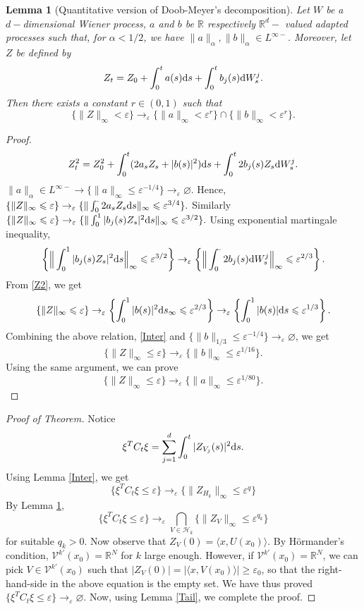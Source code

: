 \documentclass[twoside, 12pt]{book}
\numberwithin{equation}{chapter}
\newtheorem{lemma}[theorem]{Lemma}
\def\mR{{\mathbb R}}
\def\sH{{\mathscr H}}
\def\sV{{\mathscr V}}
\def\<{\langle}
\def\>{\rangle}
\def\geq{\geqslant}
\def\leq{\leqslant}
\def\d{\text{\rm{d}}}
\def\eps{\varepsilon}
\begin{document}
	
	\begin{lemma}[Quantitative version of Doob-Meyer's decomposition]\label{Z-to-ab}
	Let $W$ be a $d-$dimensional Wiener process, $a$ and $b$ be $\mR$ respectively $\mR^d-$ valued adapted processes such that, for $\alpha <1/2$, we have $\|a\|_\alpha , \|b\|_\alpha \in L^{\infty-}$. Moreover, let $Z$ be defined by
	$$Z_t=Z_0+\int_0^t a(s)\d s+\int_0^t b_j(s)\d W^j_s. $$
	Then there exists a constant $r\in(0, 1)$ such that
	$$\{\|Z\|_\infty<\eps\} \rightarrow_\eps \{\|a\|_\infty<\eps^r\} \cap\{\|b\|_{\infty}< \eps^r\} .$$
	\end{lemma}
	\begin{proof}
		\begin{align}\label{Z2} Z_t^2=Z_0^2+\int_0^t (2a_sZ_s+|b(s)|^2)\d s+\int_0^t 2b_j(s) Z_s\d W^j_s. \end{align}
		$\|a\|_\alpha \in L^{\infty-}\rightarrow \{\|a\|_\infty\leq \eps^{-1/4}\}\rightarrow_\eps\varnothing. $ Hence, $\{ \|Z\|_\infty\leq \eps\}\rightarrow_\eps \{\|\int_0^\cdot 2a_sZ_s\d s\|_\infty \leq \eps^{3/4}\}. $ Similarly 
		$\{ \|Z\|_\infty\leq \eps\}\rightarrow_\eps \{\|\int_0^1 |b_j(s)Z_s|^2 \d s\|_\infty \leq \eps^{3/2}\}.$ Using exponential martingale inequality, 
		$$\left\{\Big\|\int_0^1 |b_j(s)Z_s|^2 \d s\Big\|_\infty  \leq \eps^{3/2}\right\}\rightarrow_\eps \left\{ \Big\|\int_0^\cdot  2b_j(s)\d W^j_s\Big\|_\infty \leq \eps^{2/3}\right\}. $$
		From \eqref{Z2}, we get 
		$$\{ \|Z\|_\infty\leq \eps\}\rightarrow_\eps \left\{\int_0^1 |b(s)|^2\d s_\infty\leq \eps^{2/3}\right\}\rightarrow_\eps \left\{\int_0^1 |b(s)|\d s\leq \eps^{1/3}\right\}. $$
		Combining the above relation, \eqref{Inter} and $\{\|b\|_{1/3}\leq \eps^{-1/4}\}\rightarrow_\eps\varnothing$, we get 
		$$\{ \|Z\|_\infty\leq \eps\}\rightarrow_\eps \{\|b\|_\infty\leq \eps^{1/16}\}. $$
		Using the same argument, we can prove 
		$$\{ \|Z\|_\infty\leq \eps\}\rightarrow_\eps \{\|a\|_\infty\leq \eps^{1/80}\}. $$
		
	\end{proof}
	
	\begin{proof}[Proof of Theorem]
		Notice 
		\begin{align}\label{CtoZ}\xi^TC_t\xi=\sum_{j=1}^d \int_0^t |Z_{V_j}(s)|^2\d s.\end{align}
		Using Lemma \ref{Inter}, we get 
		$$\{\xi^TC_t\xi\leq \eps\}\rightarrow_\eps \{ \|Z_{H_k}\|_\infty\leq \eps^q\}$$
		By Lemma \ref{Z-to-ab}, 
		$$\{\xi^TC_t\xi\leq \eps\}\rightarrow_\eps \bigcap_{V\in \sH_k}\{ \|Z_{V}\|_\infty\leq \eps^{q_k}\}$$
		for suitable $q_k > 0.$ Now observe that $Z_V (0) = \<x, U (x_0 )\>$. By H\"ormander’s condition, $\sV^{k'}(x_0) = \mR^N$ for $k$ large enough. However, if $\sV^{k'}(x_0) = \mR^N$, we can pick $V \in \sV^{k'}(x_0)$ such that $|Z_V (0)| =|\<x, V (x_0 )\>| \geq \eps_0$, so that the right-hand-side in the above equation is the empty set. We have thus proved $\{\xi^TC_t\xi \leq\eps\} \rightarrow_\eps \varnothing$. Now, using  Lemma \ref{Tail}, we complete the proof.
	\end{proof}
	 
\end{document}
